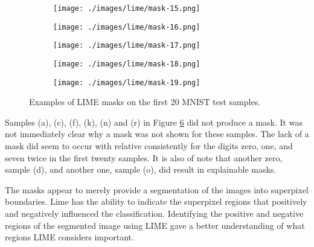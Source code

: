 \begin{figure}[H]
    \begin{subfigure}{.19\columnwidth}
        \centering
        \texttt{[image: ./images/lime/mask-15.png]}
        \caption{}
        \label{fig:lime_mnist10}
    \end{subfigure}%
    \begin{subfigure}{.19\columnwidth}
        \centering
        \texttt{[image: ./images/lime/mask-16.png]}
        \caption{}
        \label{fig:lime_mnist11}
    \end{subfigure}%
    \begin{subfigure}{.19\columnwidth}
        \centering
        \texttt{[image: ./images/lime/mask-17.png]}
        \caption{}
        \label{fig:lime_mnist12}
    \end{subfigure}
    \begin{subfigure}{.19\columnwidth}
        \centering
        \texttt{[image: ./images/lime/mask-18.png]}
        \caption{}
        \label{fig:line_skel18ma}
    \end{subfigure}%
    \begin{subfigure}{.19\columnwidth}
        \centering
        \texttt{[image: ./images/lime/mask-19.png]}
        \caption{}
        \label{fig:lime_mnist14}
    \end{subfigure}

    \caption{Examples of LIME masks on the first 20 MNIST test samples.}
    \label{fig:lime_mnist_masks}
\end{figure}

Samples (a), (c), (f), (k), (n) and (r) in Figure \ref{fig:lime_mnist_masks} did
not produce a mask.  It was not immediately clear why a mask was not shown for
these samples. The lack of a mask did seem to occur with relative consistently
for the digits zero, one, and seven twice in the first twenty samples. It is
also of note that another zero, sample (d), and another one, sample (o), did result
in explainable masks.

The masks appear to merely provide a segmentation of the images into superpixel
boundaries. Lime has the ability to indicate the superpixel regions that
positively and negatively influenced the classification.  Identifying the
positive and negative regions of the segmented image using LIME gave a better
understanding of what regions LIME considers important.

